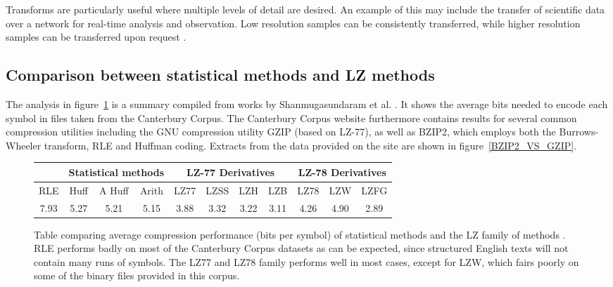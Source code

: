 Transforms are particularly useful where multiple levels of detail are desired. An example of this may include the transfer of scientific data over a network 
for real-time analysis and observation. Low resolution samples can be consistently transferred, while higher resolution samples can be transferred upon request \cite{Tao:1994:PTS:951087.951108}.
\subsection{Comparison between statistical methods and LZ methods}
The analysis in figure~\ref{STATISTICAL_VS_LZ} is a summary compiled from works by Shanmugasundaram et al. \cite{shanmugasundaram2011comparative}. It shows the average bits 
needed to encode each symbol in files taken from the Canterbury Corpus. The Canterbury Corpus website furthermore contains results for several common compression utilities 
including the GNU compression utility GZIP (based on LZ-77), as well as BZIP2, which employs both the Burrows-Wheeler transform, RLE and Huffman coding. Extracts from the data 
provided on the site are shown in figure~\ref{BZIP2_VS_GZIP}.
\begin{figure}[h!]
\begin{mdframed}
\centering
\begin{tabular}{|c|c|c|c|c|c|c|c|c|c|c|}
 \hline
 & \multicolumn{3}{|c|}{Statistical methods} & \multicolumn{4}{|c|}{LZ-77 Derivatives} & \multicolumn{3}{|c|}{LZ-78 Derivatives} \\
 \hline
 RLE & Huff & A Huff & Arith & LZ77 & LZSS & LZH & LZB & LZ78 & LZW & LZFG \\
 \hline
 7.93 & 5.27 & 5.21 & 5.15 & 3.88 & 3.32 & 3.22 & 3.11 & 4.26 & 4.90 & 2.89 \\
 \hline
\end{tabular}
\caption[Bits per symbol comparison between statistical and LZ methods]{Table comparing average compression performance (bits per symbol) of statistical methods and the LZ family of methods \cite{shanmugasundaram2011comparative}. RLE performs
 badly on most of the Canterbury Corpus datasets as can be expected, since structured English texts will not contain many runs of symbols. The LZ77 and LZ78 family performs well in most cases,
 except for LZW, which fairs poorly on some of the binary files provided in this corpus.}
 \label{STATISTICAL_VS_LZ}
\end{mdframed}
\end{figure}
